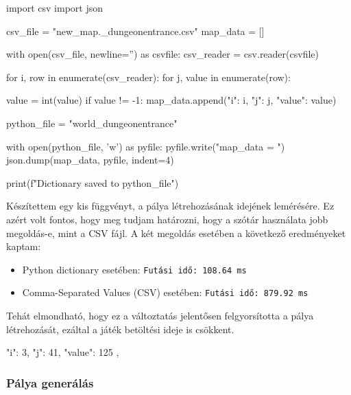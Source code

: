 \begin{python}[caption={CSV formátum dictionary formátumra konvertálása},label=py:csvtodict]
    import csv
    import json
    
    csv_file = "new_map\MSmap._dungeonentrance.csv"
    map_data = []
    
    with open(csv_file, newline='') as csvfile:
        csv_reader = csv.reader(csvfile)
    
        for i, row in enumerate(csv_reader):
            for j, value in enumerate(row):
    
                value = int(value)
                if value != -1:
                    map_data.append({"i": i, "j": j, "value": value})
    
    python_file = "world_dungeonentrance"
    
    with open(python_file, 'w') as pyfile:
        pyfile.write("map_data = ")
        json.dump(map_data, pyfile, indent=4)
    
    print(f"Dictionary saved to {python_file}")
    
\end{python}


Készítettem egy kis függvényt, a pálya létrehozásának idejének lemérésére. Ez azért volt fontos, hogy meg tudjam határozni, hogy a szótár használata jobb megoldás-e, mint a CSV fájl. A két megoldás esetében a következő eredményeket kaptam:

\begin{itemize}
    
    \item Python dictionary esetében:
    \verb{Futási idő: 108.64 ms{
\item Comma-Separated Values (CSV) esetében:
    \verb{Futási idő: 879.92 ms{

\end{itemize}
    
 Tehát elmondható, hogy ez a változtatás jelentősen felgyorsította a pálya létrehozását, ezáltal a játék betöltési ideje is csökkent.



\begin{python}[caption={Minta az átalakított struktúrára
    }, label=py:átalakított struktúra]
    {
        "i": 3,
        "j": 41,
        "value": 125
    },
\end{python}

\subsubsection{Pálya generálás}

